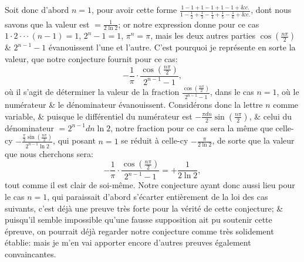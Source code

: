 \documentclass[12pt]{article}
\theoremstyle{definition}
\begin{document}
Soit donc d'abord $n = 1$, pour avoir cette forme $\frac{1 - 1 + 1 - 1 + 1 - 1 + \&c.}{1 - \frac{1}{2} + \frac{1}{3} - \frac{1}{4} + \frac{1}{5} - \frac{1}{6} + \&c.}$, dont nous savons que la valeur est $= \frac{1}{2 \ln 2}$; or notre expression donne pour ce cas $1 \cdot 2 \cdot \cdot \cdot (n-1) = 1$, $2^n - 1 = 1$, $\pi^n = \pi$, mais les deux autres parties $\cos(\frac{n\pi}{2})$ \& $2^{n-1} - 1$ évanouissent l'une et l'autre. C'est pourquoi je représente en sorte la valeur, que notre conjecture fournit pour ce cas:
$$-\frac{1}{\pi}\cdot \frac{\cos\left(\displaystyle \frac{n\pi}{2}\right)}{2^{n-1} - 1},$$
où il s'agit de déterminer la valeur de la fraction $\frac{\cos\left(\frac{n\pi}{2}\right)}{2^{n-1} - 1}$, dans le cas $n = 1$, où le numérateur \& le dénominateur évanouissent. Considérons donc la lettre $n$ comme variable, \& puisque le différentiel du numérateur est $-\frac{\pi dn}{2}\sin(\frac{n \pi}{2})$, \& celui du dénominateur $= 2^{n-1}dn\ln2$, notre fraction pour ce cas sera la même que celle-cy $-\frac{\frac{\pi}{2}\sin(\frac{n \pi}{2})}{2^{n-1}\ln 2}$, qui posant $n = 1$ se réduit à celle-cy $- \frac{\pi}{2 \ln 2}$, de sorte que la valeur que nous cherchons sera:
$$-\frac{1}{\pi}\cdot \frac{\cos\left(\displaystyle \frac{n\pi}{2}\right)}{2^{n-1} - 1} = + \frac{1}{2 \ln 2},$$
tout comme il est clair de soi-même. Notre conjecture ayant donc aussi lieu pour le cas $n = 1$, qui paraissait d'abord s'écarter entièrement de la loi des cas suivants, c'est déjà une preuve très forte pour la vérité de cette conjecture; \& puisqu'il semble impossible qu'une fausse supposition ait pu soutenir cette épreuve, on pourrait déjà regarder notre conjecture comme très solidement établie: mais je m'en vai apporter encore d'autres preuves également convaincantes.
\end{document}
